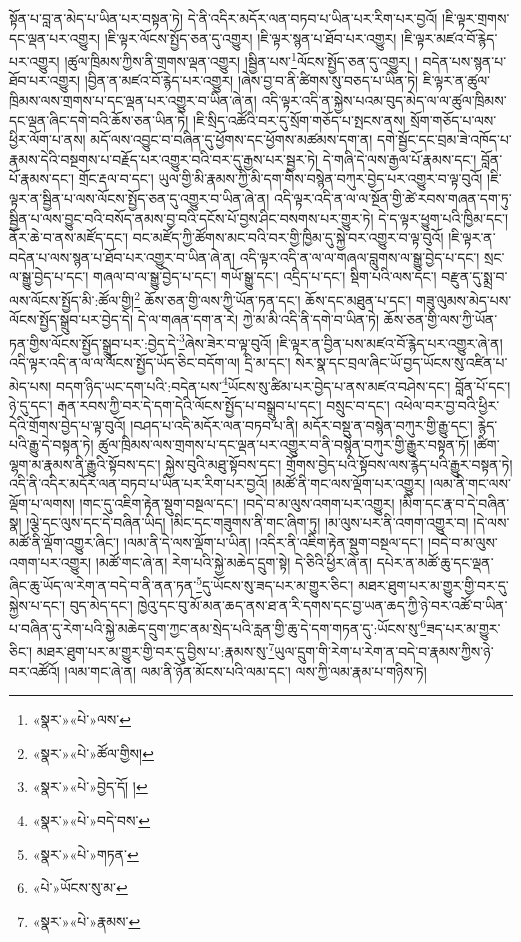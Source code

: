 སྟོན་པ་བླ་ན་མེད་པ་ཡིན་པར་བསྟན་ཏེ། དེ་ནི་འདིར་མདོར་ལན་བཏབ་པ་ཡིན་པར་རིག་པར་བྱའོ། །ཇི་ལྟར་གྲགས་དང་ལྡན་པར་འགྱུར། །ཇི་ལྟར་ལོངས་སྤྱོད་ཅན་དུ་འགྱུར། །ཇི་ལྟར་སྙན་པ་ཐོབ་པར་འགྱུར། །ཇི་ལྟར་མཛའ་བོ་རྙེད་པར་འགྱུར། །ཚུལ་ཁྲིམས་ཀྱིས་ནི་གྲགས་ལྡན་འགྱུར། །སྦྱིན་པས་\footnote{«སྣར་»«པེ་»ལས་}ལོངས་སྤྱོད་ཅན་དུ་འགྱུར། །
བདེན་པས་སྙན་པ་ཐོབ་པར་འགྱུར། །བྱིན་ན་མཛའ་བོ་རྙེད་པར་འགྱུར། །ཞེས་བྱ་བ་ནི་ཚིགས་སུ་བཅད་པ་ཡིན་ཏེ། ཇི་ལྟར་ན་ཚུལ་ཁྲིམས་ལས་གྲགས་པ་དང་ལྡན་པར་འགྱུར་བ་ཡིན་ཞེ་ན། འདི་ལྟར་འདི་ན་སྐྱེས་པའམ་བུད་མེད་ལ་ལ་ཚུལ་ཁྲིམས་དང་ལྡན་ཞིང་དགེ་བའི་ཆོས་ཅན་ཡིན་ཏེ། །ཇི་སྲིད་འཚོའི་བར་དུ་སྲོག་གཅོད་པ་སྤངས་ནས། སྲོག་གཅོད་པ་ལས་ཕྱིར་ལོག་པ་ནས། མདོ་ལས་འབྱུང་བ་བཞིན་དུ་ཕྱོགས་དང་ཕྱོགས་མཚམས་དག་ན། དགེ་སྦྱོང་དང་བྲམ་ཟེ་འཁོད་པ་རྣམས་དེའི་བསྔགས་པ་བརྗོད་པར་འགྱུར་བའི་བར་དུ་རྒྱས་པར་སྦྱར་ཏེ། དེ་གཞི་དེ་ལས་རྒྱལ་པོ་རྣམས་དང་། བློན་པོ་རྣམས་དང་། གྲོང་རྡལ་བ་དང་། ཡུལ་གྱི་མི་རྣམས་ཀྱི་མི་དག་གིས་བསྙེན་བཀུར་བྱེད་པར་འགྱུར་བ་ལྟ་བུའོ། །ཇི་ལྟར་ན་སྦྱིན་པ་ལས་ལོངས་སྤྱོད་ཅན་དུ་འགྱུར་བ་ཡིན་ཞེ་ན། འདི་ལྟར་འདི་ན་ལ་ལ་སྔོན་གྱི་ཚེ་རབས་གཞན་དག་ཏུ་སྦྱིན་པ་ལས་བྱུང་བའི་བསོད་ནམས་བྱ་བའི་དངོས་པོ་བྱས་ཤིང་བསགས་པར་གྱུར་ཏེ། དེ་ད་ལྟར་ཕྱུག་པའི་ཁྱིམ་དང་། ནོར་ཆེ་བ་ནས་མཛོད་དང་། བང་མཛོད་ཀྱི་ཚོགས་མང་བའི་བར་གྱི་ཁྱིམ་དུ་སྐྱེ་བར་འགྱུར་བ་ལྟ་བུའོ། །ཇི་ལྟར་ན་བདེན་པ་ལས་སྙན་པ་ཐོབ་པར་འགྱུར་བ་ཡིན་ཞེ་ན། འདི་ལྟར་འདི་ན་ལ་ལ་གཞལ་བླུགས་ལ་སྒྱུ་བྱེད་པ་དང་། སྲང་ལ་སྒྱུ་བྱེད་པ་དང་། གཞལ་བ་ལ་སྒྱུ་བྱེད་པ་དང་། གཡོ་སྒྱུ་དང་། འདྲིད་པ་དང་། སྡིག་པའི་ལས་དང་། བརྫུན་དུ་སྨྲ་བ་ལས་ལོངས་སྤྱོད་མི་:ཚོལ་གྱི།\footnote{«སྣར་»«པེ་»ཚོལ་གྱིས།} ཆོས་ཅན་གྱི་ལས་ཀྱི་ཡོན་ཏན་དང་། ཆོས་དང་མཐུན་པ་དང་། གཟུ་ལུམས་མེད་པས་ལོངས་སྤྱོད་སྒྲུབ་པར་བྱེད་དེ། དེ་ལ་གཞན་དག་ན་རེ། ཀྱེ་མ་མི་འདི་ནི་དགེ་བ་ཡིན་ཏེ། ཆོས་ཅན་གྱི་ལས་ཀྱི་ཡོན་ཏན་གྱིས་ལོངས་སྤྱོད་སྒྲུབ་པར་:བྱེད་དེ་\footnote{«སྣར་»«པེ་»བྱེད་དོ། །}ཞེས་ཟེར་བ་ལྟ་བུའོ། །ཇི་ལྟར་ན་བྱིན་པས་མཛའ་བོ་རྙེད་པར་འགྱུར་ཞེ་ན། འདི་ལྟར་འདི་ན་ལ་ལ་ལོངས་སྤྱོད་ཡོད་ཅིང་བདོག་ལ། དྲི་མ་དང་། སེར་སྣ་དང་བྲལ་ཞིང་ཡོ་བྱད་ཡོངས་སུ་འཛིན་པ་མེད་པས། བདག་ཉིད་ཡང་དག་པའི་:བདེན་པས་\footnote{«སྣར་»«པེ་»བདེ་བས་}ཡོངས་སུ་ཚིམ་པར་བྱེད་པ་ནས་མཛའ་བཤེས་དང་། བློན་པོ་དང་། ཉེ་དུ་དང་། རྒན་རབས་ཀྱི་བར་དེ་དག་དེའི་ལོངས་སྤྱོད་པ་བསྒྲུབ་པ་དང་། བསྲུང་བ་དང་། འཕེལ་བར་བྱ་བའི་ཕྱིར་དེའི་གྲོགས་བྱེད་པ་ལྟ་བུའོ། །བཤད་པ་འདི་མདོར་ལན་བཏབ་པ་ནི། མདོར་བསྡུ་ན་བསྙེན་བཀུར་གྱི་རྒྱུ་དང་། རྙེད་པའི་རྒྱུ་དེ་བསྟན་ཏེ། ཚུལ་ཁྲིམས་ལས་གྲགས་པ་དང་ལྡན་པར་འགྱུར་བ་ནི་བསྙེན་བཀུར་གྱི་རྒྱུར་བསྟན་ཏོ། །ཚིག་ལྷག་མ་རྣམས་ནི་རྒྱུའི་སྟོབས་དང་། སྐྱེས་བུའི་མཐུ་སྟོབས་དང་། གྲོགས་བྱེད་པའི་སྟོབས་ལས་རྙེད་པའི་རྒྱུར་བསྟན་ཏེ། འདི་ནི་འདིར་མདོར་ལན་བཏབ་པ་ཡིན་པར་རིག་པར་བྱའོ། །མཚོ་ནི་གང་ལས་ལྡོག་པར་འགྱུར། །ལམ་ནི་གང་ལས་ལྡོག་པ་ལགས། །གང་དུ་འཇིག་རྟེན་སྡུག་བསྔལ་དང་། །བདེ་བ་མ་ལུས་འགག་པར་འགྱུར། །མིག་དང་རྣ་བ་དེ་བཞིན་སྣ། །ལྕེ་དང་ལུས་དང་དེ་བཞིན་ཡིད། །མིང་དང་གཟུགས་ནི་གང་ཞིག་ཏུ། །མ་ལུས་པར་ནི་འགག་འགྱུར་བ། །དེ་ལས་མཚོ་ནི་ལྡོག་འགྱུར་ཞིང་། །ལམ་ནི་དེ་ལས་ལྡོག་པ་ཡིན། །འདིར་ནི་འཇིག་རྟེན་སྡུག་བསྔལ་དང་། །བདེ་བ་མ་ལུས་འགག་པར་འགྱུར། །མཚོ་གང་ཞེ་ན། རེག་པའི་སྐྱེ་མཆེད་དྲུག་སྟེ། དེ་ཅིའི་ཕྱིར་ཞེ་ན། དཔེར་ན་མཚོ་ཆུ་དང་ལྡན་ཞིང་ཆུ་ཡོད་ལ་རེག་ན་བདེ་བ་ནི་ནན་ཏན་\footnote{«སྣར་»«པེ་»གཏན་}དུ་ཡོངས་སུ་ཟད་པར་མ་གྱུར་ཅིང་། མཐར་ཐུག་པར་མ་གྱུར་གྱི་བར་དུ་སྐྱེས་པ་དང་། བུད་མེད་དང་། ཁྱེའུ་དང་བུ་མོ་མན་ཆད་ནས་ཐ་ན་རི་དགས་དང་བྱ་ཡན་ཆད་ཀྱི་ཉེ་བར་འཚོ་བ་ཡིན་པ་བཞིན་དུ་རེག་པའི་སྐྱེ་མཆེད་དྲུག་ཀྱང་ནམ་སྲེད་པའི་རླན་གྱི་ཆུ་དེ་དག་གཏན་དུ་:ཡོངས་སུ་\footnote{«པེ་»ཡོངས་སུ་མ་}ཟད་པར་མ་གྱུར་ཅིང་། མཐར་ཐུག་པར་མ་གྱུར་གྱི་བར་དུ་བྱིས་པ་:རྣམས་སུ་\footnote{«སྣར་»«པེ་»རྣམས་}ཡུལ་དྲུག་གི་རེག་པ་རེག་ན་བདེ་བ་རྣམས་ཀྱིས་ཉེ་བར་འཚོའོ། །ལམ་གང་ཞེ་ན། ལམ་ནི་ཉོན་མོངས་པའི་ལམ་དང་། ལས་ཀྱི་ལམ་རྣམ་པ་གཉིས་ཏེ། 